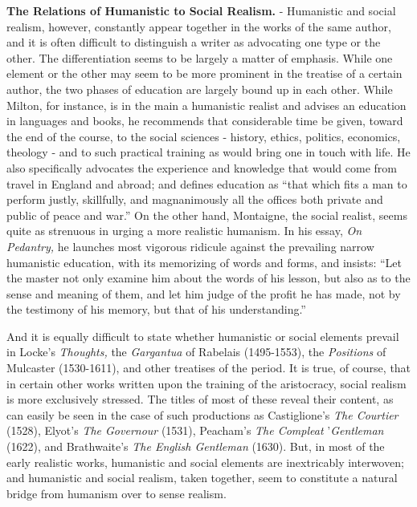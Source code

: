 \documentclass[
]{book}
\begin{document}
\textbf{The Relations of Humanistic to Social Realism.} - Humanistic and social realism, however, constantly appear together in the works of the same author, and it is often difficult to distinguish a writer as advocating one type or the other. The differentiation seems to be largely a matter of emphasis. While one element or the other may seem to be more prominent in the treatise of a certain author, the two phases of education are largely bound up in each other. While Milton, for instance, is in the main a humanistic realist and advises an education in languages and books, he recommends that considerable time be given, toward the end of the course, to the social sciences - history, ethics, politics, economics, theology - and to such practical training as would bring one in touch with life. He also specifically advocates the experience and knowledge that would come from travel in England and abroad; and defines education as ``that which fits a man to perform justly, skillfully, and magnanimously all the offices both private and public of peace and war.'' On the other hand, Montaigne, the social realist, seems quite as strenuous in urging a more realistic humanism. In his essay, \emph{On Pedantry,} he launches most vigorous ridicule against the prevailing narrow humanistic education, with its memorizing of words and forms, and insists: ``Let the master not only examine him about the words of his lesson, but also as to the sense and meaning of them, and let him judge of the profit he has made, not by the testimony of his memory, but that of his understanding.''

And it is equally difficult to state whether humanistic or social elements prevail in Locke's \emph{Thoughts,} the \emph{Gargantua} of Rabelais (1495-1553), the \emph{Positions} of Mulcaster (1530-1611), and other treatises of the period. It is true, of course, that in certain other works written upon the training of the aristocracy, social realism is more exclusively stressed. The titles of most of these reveal their content, as can easily be seen in the case of such productions as Castiglione's \emph{The Courtier} (1528), Elyot's \emph{The Governour} (1531), Peacham's \emph{The Compleat} '\emph{Gentleman} (1622), and Brathwaite's \emph{The English Gentleman} (1630). But, in most of the early realistic works, humanistic and social elements are inextricably interwoven; and humanistic and social realism, taken together, seem to constitute a natural bridge from humanism over to sense realism.
\end{document}
